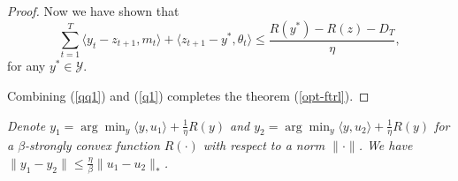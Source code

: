 \documentclass[pmlr]{jmlr} %
\newcommand{\YY}{\mathcal{Y}}
\newcommand{\pr}[1]{\left(#1\right)}
\begin{document}
\begin{proof}
Now we have shown that 
\begin{equation} \label{q1}
\sum_{t=1}^{T}  \langle y_{t} - z_{t+1} , m_{t} \rangle + \langle z_{t+1} - y^{*}, \theta_{t} \rangle
\leq \frac{ R(y^{*}) - R(z) - D_{T} }{\eta},
\end{equation}
for any $y^{*} \in \YY$.
%


Combining (\ref{qq1}) and (\ref{q1}) completes the theorem (\ref{opt-ftrl}).


\end{proof}


\begin{lemma} \label{aux:optFTRL}
\textit{
Denote $y_{1} = \arg\min_{y} \langle y, u_{1} \rangle + \frac{1}{\eta} R(y)$
and $y_{2} = \arg\min_{y} \langle y, u_{2} \rangle + \frac{1}{\eta} R(y)$
for a $\beta$-strongly convex function $R(\cdot)$ with respect to a norm $\| \cdot \|$.
We have $\| y_{1} - y_{2} \| \leq \frac{\eta}{\beta} \| u_{1} - u_{2}\|_{*}$.} 
\end{lemma}
\end{document}
